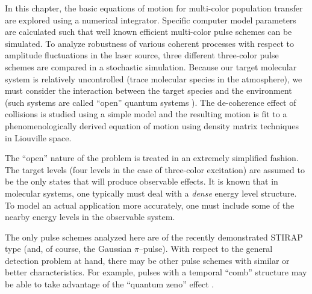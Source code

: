In this chapter, the basic equations of motion for multi-color population transfer are explored using a numerical integrator.
Specific computer model parameters are calculated such that well known efficient multi-color pulse schemes can be simulated. To analyze robustness of various coherent processes with respect to amplitude fluctuations in the laser source, three different three-color pulse schemes are compared in a stochastic simulation. Because our target molecular system is relatively uncontrolled (trace molecular species in the atmosphere), we must consider the interaction between the target species and the environment (such systems are called ``open'' quantum systems \cite{Blum:1981a}). The de-coherence effect of collisions is studied using a simple model and the resulting motion is fit to a phenomenologically derived equation of motion using density matrix techniques in Liouville space.

The ``open'' nature of the problem is treated in an extremely simplified fashion. The target levels (four levels in the case of three-color excitation) are assumed to be the only states that will produce observable effects. It is known that in molecular systems, one typically must deal with a \emph{dense} energy level structure. To model an actual application more accurately, one must include some of the nearby energy levels in the observable system.

The only pulse schemes analyzed here are of the recently demonstrated STIRAP type (and, of course, the Gaussian $\pi$--pulse). With respect to the general detection problem at hand, there may be other pulse schemes with similar or better characteristics. For example, pulses with a temporal ``comb'' structure may be able to take advantage of the ``quantum zeno'' effect \cite{Itano:1990a}.

